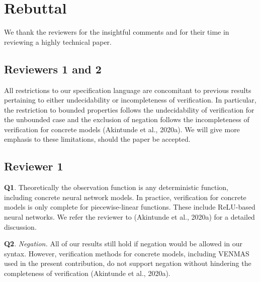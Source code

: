 \documentclass{article}
\begin{document}




\section*{Rebuttal}
We thank the reviewers for the insightful comments and for their time in
reviewing a highly technical paper.


\subsection*{Reviewers 1 and 2}
All restrictions to our specification language are concomitant to previous
results pertaining to either undecidability or incompleteness of verification.
In particular, the restriction to bounded properties follows the undecidability
of verification for the unbounded case and the exclusion of negation follows
the incompleteness of verification for concrete models (Akintunde et al.,
2020a). We will give more emphasis to these limitations, should the paper be
accepted.

\subsection*{Reviewer 1} 

\textbf{Q1}.  Theoretically the observation function is any deterministic
function, including concrete neural network models. In practice, verification
for concrete models is only complete for piecewise-linear functions. These
include ReLU-based neural networks. We refer the reviewer to (Akintunde et al.,
2020a) for a detailed discussion.

\noindent
\textbf{Q2}. {\em Negation.} All of our results still hold if
negation would be allowed in our syntax. However, verification methods for
concrete models, including VENMAS used in the present contribution, do not
support negation without hindering the completeness of verification (Akintunde
et al., 2020a). 
\end{document}
